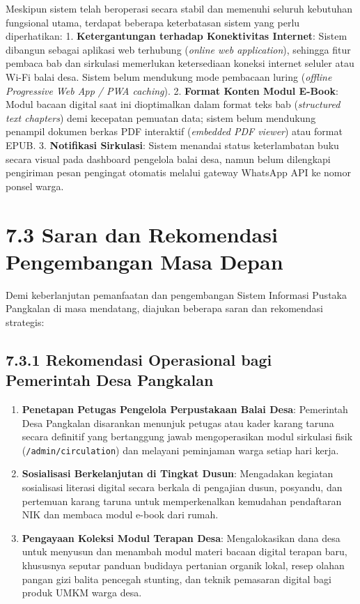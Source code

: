 \documentclass[
  indonesian,
  12pt,
]{report}
\providecommand{\tightlist}{%
  \setlength{\itemsep}{0pt}\setlength{\parskip}{0pt}}
\begin{document}
Meskipun sistem telah beroperasi secara stabil dan memenuhi seluruh
kebutuhan fungsional utama, terdapat beberapa keterbatasan sistem yang
perlu diperhatikan: 1. \textbf{Ketergantungan terhadap Konektivitas
Internet}: Sistem dibangun sebagai aplikasi web terhubung (\emph{online
web application}), sehingga fitur pembaca bab dan sirkulasi memerlukan
ketersediaan koneksi internet seluler atau Wi-Fi balai desa. Sistem
belum mendukung mode pembacaan luring (\emph{offline Progressive Web App
/ PWA caching}). 2. \textbf{Format Konten Modul E-Book}: Modul bacaan
digital saat ini dioptimalkan dalam format teks bab (\emph{structured
text chapters}) demi kecepatan pemuatan data; sistem belum mendukung
penampil dokumen berkas PDF interaktif (\emph{embedded PDF viewer}) atau
format EPUB. 3. \textbf{Notifikasi Sirkulasi}: Sistem menandai status
keterlambatan buku secara visual pada dashboard pengelola balai desa,
namun belum dilengkapi pengiriman pesan pengingat otomatis melalui
gateway WhatsApp API ke nomor ponsel warga.

\section{7.3 Saran dan Rekomendasi Pengembangan Masa
Depan}\label{saran-dan-rekomendasi-pengembangan-masa-depan}

Demi keberlanjutan pemanfaatan dan pengembangan Sistem Informasi Pustaka
Pangkalan di masa mendatang, diajukan beberapa saran dan rekomendasi
strategis:

\subsection{7.3.1 Rekomendasi Operasional bagi Pemerintah Desa
Pangkalan}\label{rekomendasi-operasional-bagi-pemerintah-desa-pangkalan}

\begin{enumerate}
\def\labelenumi{\arabic{enumi}.}
\tightlist
\item
  \textbf{Penetapan Petugas Pengelola Perpustakaan Balai Desa}:
  Pemerintah Desa Pangkalan disarankan menunjuk petugas atau kader
  karang taruna secara definitif yang bertanggung jawab mengoperasikan
  modul sirkulasi fisik (\texttt{/admin/circulation}) dan melayani
  peminjaman warga setiap hari kerja.
\item
  \textbf{Sosialisasi Berkelanjutan di Tingkat Dusun}: Mengadakan
  kegiatan sosialisasi literasi digital secara berkala di pengajian
  dusun, posyandu, dan pertemuan karang taruna untuk memperkenalkan
  kemudahan pendaftaran NIK dan membaca modul e-book dari rumah.
\item
  \textbf{Pengayaan Koleksi Modul Terapan Desa}: Mengalokasikan dana
  desa untuk menyusun dan menambah modul materi bacaan digital terapan
  baru, khususnya seputar panduan budidaya pertanian organik lokal,
  resep olahan pangan gizi balita pencegah stunting, dan teknik
  pemasaran digital bagi produk UMKM warga desa.
\end{enumerate}
\end{document}
